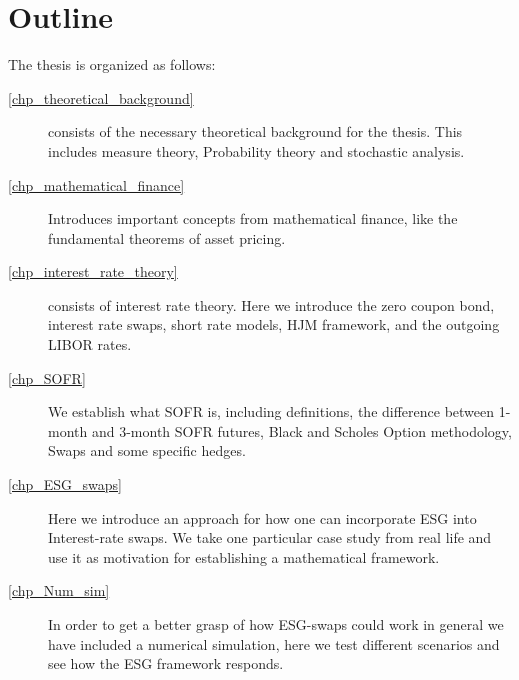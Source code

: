 \chapter{Outline}
\label{intro}
\begin{comment}
The rest of the text is organised as follows. This is an example of a description list; see more lists in \cref{discussion} and \vref{tab14}.    
\end{comment}

The thesis is organized as follows: 
\begin{description}
    \item[\cref{chp_theoretical_background}] consists of the necessary theoretical background for the thesis. This includes measure theory, Probability theory and stochastic analysis. 

    \item[\cref{chp_mathematical_finance}] Introduces important concepts from mathematical finance, like the fundamental theorems of asset pricing. 

    \item[\cref{chp_interest_rate_theory}] consists of interest rate theory. Here we introduce the zero coupon bond, interest rate swaps, short rate models, HJM framework, and the outgoing LIBOR rates.

    \item[\cref{chp_SOFR}] We establish what SOFR is, including definitions, the difference between 1-month and 3-month SOFR futures, Black and Scholes Option methodology, Swaps and some specific hedges.

    \item[\cref{chp_ESG_swaps}] Here we introduce an approach for how one can incorporate ESG into Interest-rate swaps. We take one particular case study from real life and use it as motivation for establishing a mathematical framework. 

    \item[\cref{chp_Num_sim}] In order to get a better grasp of how ESG-swaps could work in general we have included a numerical simulation, here we test different scenarios and see how the ESG framework responds.     


\end{description}
